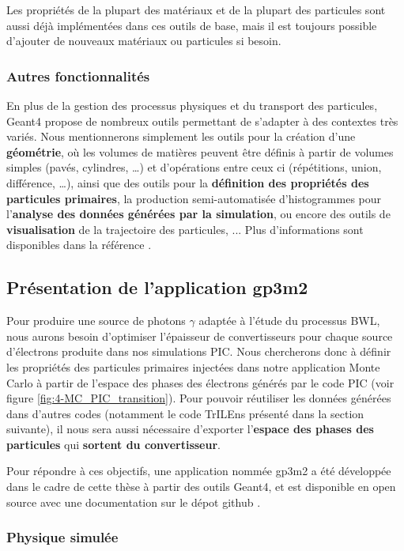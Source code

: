 \begin{refsection}
Les propriétés de la plupart des matériaux et de la plupart des particules sont aussi déjà implémentées dans ces outils de base, mais il est toujours possible d'ajouter de nouveaux matériaux ou particules si besoin.

\subsubsection{Autres fonctionnalités}

En plus de la gestion des processus physiques et du transport des particules, Geant4 propose de nombreux outils permettant de s'adapter à des contextes très variés. Nous mentionnerons simplement les outils pour la création d'une \textbf{géométrie}, où les volumes de matières peuvent être définis à partir de volumes simples (pavés, cylindres, …) et d'opérations entre ceux ci (répétitions, union, différence, …), ainsi que des outils pour la \textbf{définition des propriétés des particules primaires}, la production semi-automatisée d'histogrammes pour l'\textbf{analyse des données générées par la simulation}, ou encore des outils de \textbf{visualisation} de la trajectoire des particules, ... Plus d'informations sont disponibles dans la référence \parencite{geant4_appdev}.


\subsection{Présentation de l'application gp3m2}

Pour produire une source de photons $\gamma$ adaptée à l'étude du processus BWL, nous aurons besoin d'optimiser l'épaisseur de convertisseurs pour chaque source d'électrons produite dans nos simulations PIC. Nous chercherons donc à définir les propriétés des particules primaires injectées dans notre application Monte Carlo à partir de l'espace des phases des électrons générés par le code PIC (voir figure \ref{fig:4-MC_PIC_transition}). Pour pouvoir réutiliser les données générées dans d'autres codes (notamment le code TrILEns présenté dans la section suivante), il nous sera aussi nécessaire d'exporter l'\textbf{espace des phases des particules} qui \textbf{sortent du convertisseur}.

Pour répondre à ces objectifs, une application nommée gp3m2 a été développée dans le cadre de cette thèse à partir des outils Geant4, et est disponible en open source avec une documentation sur le dépot github \parencite{gp3m2}.

\subsubsection{Physique simulée}


\end{refsection}
